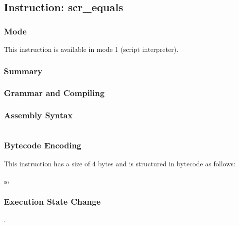 \subsection{Instruction: scr\_equals}

\subsubsection{Mode}
This instruction is available in mode 1 (script interpreter).
\subsubsection{Summary}


\subsubsection{Grammar and Compiling}


\subsubsection{Assembly Syntax}

\begin{myquote}
\begin{verbatim}

\end{verbatim}
\end{myquote}

\subsubsection{Bytecode Encoding}

This instruction has a size of 4 bytes and is structured in bytecode as follows:

$_{00}$\ 

\subsubsection{Execution State Change}

.


